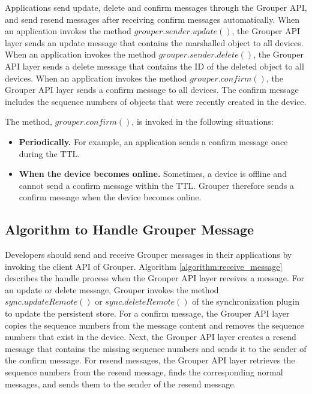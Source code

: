 \documentclass[a4paper,11pt]{report}
\begin{document}
Applications send update, delete and confirm messages through the Grouper API, and send resend messages after receiving confirm messages automatically.
When an application invokes the method $grouper.sender.update()$, the Grouper API layer sends an update message that contains the marshalled object to all devices.
When an application invokes the method $grouper.sender.delete()$, the Grouper API layer sends a delete message that contains the ID of the deleted object to all devices. 
When an application invokes the method $grouper.confirm()$, the Grouper API layer sends a confirm message to all devices. 
The confirm message includes the sequence numbers of objects that were recently created in the device.

The method, $grouper.confirm()$, is invoked in the following situations:

\begin{itemize}[leftmargin=7mm]
	\setlength{\itemsep}{1pt}
	\setlength{\parskip}{0pt}
	\setlength{\parsep}{0pt}
	\item \textbf{Periodically.}
	For example, an application sends a confirm message once during the TTL.
	\item \textbf{When the device becomes online.} 
	Sometimes, a device is offline and cannot send a confirm message within the TTL.
	Grouper therefore sends a confirm message when the device becomes online.
\end{itemize}

\subsection{Algorithm to Handle Grouper Message}

Developers should send and receive Grouper messages in their applications by invoking the client API of Grouper.
Algorithm \ref{algorithm:receive_message} describes the handle process when the Grouper API layer receives a message.
For an update or delete message, Grouper invokes the method $sync.updateRemote()$ or $sync.deleteRemote()$ of the synchronization plugin to update the persistent store.
For a confirm message, the Grouper API layer copies the sequence numbers from the message content and removes the sequence numbers that exist in the device.
Next, the Grouper API layer creates a resend message that contains the missing sequence numbers and sends it to the sender of the confirm message.
For resend messages, the Grouper API layer retrieves the sequence numbers from the resend message, finds the corresponding normal messages, and sends them to the sender of the resend message.
\end{document}
